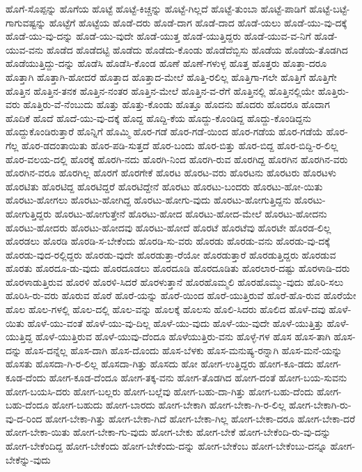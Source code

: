 {ಹೊಗೆ-ಸೊಪ್ಪನ್ನು
ಹೊಗೆಯ
ಹೊಟ್ಟೆ
ಹೊಟ್ಟೆ-ಕಿಚ್ಚನ್ನು
ಹೊಟ್ಟೆ-ಗಿಲ್ಲದೆ
ಹೊಟ್ಟೆ-ತುಂಬಾ
ಹೊಟ್ಟೆ-ಪಾಡಿಗೆ
ಹೊಟ್ಟೆ-ಬಟ್ಟೆ-ಗಾಗುವಷ್ಟನ್ನು
ಹೊಟ್ಟೆಗೆ
ಹೊಟ್ಟೆಯ
ಹೊಡೆ-ದರು
ಹೊಡೆ-ದಾಗ
ಹೊಡೆ-ದಾದ
ಹೊಡೆ-ಯಲು
ಹೊಡೆ-ಯು-ವು-ದಕ್ಕೆ
ಹೊಡೆ-ಯು-ವು-ದನ್ನು
ಹೊಡೆ-ಯು-ವುದೇ
ಹೊಡೆ-ಯುತ್ತ
ಹೊಡೆ-ಯುತ್ತಿದ್ದರು
ಹೊಡೆ-ಯುವ-ವ-ನಿಗೆ
ಹೊಡೆ-ಯುವ-ವನು
ಹೊಡೆದ
ಹೊಡೆದಟ್ಟಿ
ಹೊಡೆದು
ಹೊಡೆದು-ಕೊಂಡು
ಹೊಡೆದೆಬ್ಬಿಸು
ಹೊಡೆಯ
ಹೊಡೆಯ-ತೊಡಗಿದ
ಹೊಡೆಯುತ್ತಿದ್ದು-ದನ್ನು
ಹೊಡೆಸಿ
ಹೊಡೆಸಿ-ಕೊಂಡ
ಹೊಣೆ
ಹೊಣೆ-ಗಳುಳ್ಳ
ಹೊತ್ತ
ಹೊತ್ತರು
ಹೊತ್ತಾ-ದರೂ
ಹೊತ್ತಾಗಿ
ಹೊತ್ತಾಗಿ-ಹೋದರೆ
ಹೊತ್ತಾದ
ಹೊತ್ತಾದ-ಮೇಲೆ
ಹೊತ್ತಿ-ರಲಿಲ್ಲ
ಹೊತ್ತಿಗಾ-ಗಲೇ
ಹೊತ್ತಿಗೆ
ಹೊತ್ತಿಗೇ
ಹೊತ್ತಿನ
ಹೊತ್ತಿನ-ತನಕ
ಹೊತ್ತಿನ-ನಂತರ
ಹೊತ್ತಿನ-ಮೇಲೆ
ಹೊತ್ತಿನ-ವ-ರೆಗೆ
ಹೊತ್ತಿನಲ್ಲಿ
ಹೊತ್ತಿನಲ್ಲಿಯೇ
ಹೊತ್ತಿರು-ವರು
ಹೊತ್ತಿರು-ವೆ-ನೆಂಬುದು
ಹೊತ್ತು
ಹೊತ್ತು-ಕೊಂಡು
ಹೊತ್ತೂ
ಹೊದನು
ಹೊದರು
ಹೊದರೂ
ಹೊದಾಗ
ಹೊದಿಕೆ
ಹೊದೆ
ಹೊದೆ-ಯು-ವು-ದಕ್ಕೆ
ಹೊದ್ದ
ಹೊದ್ದಿ-ಕೆಯ
ಹೊದ್ದು-ಕೊಂಡಿದ್ದ
ಹೊದ್ದು-ಕೊಂಡಿದ್ದನು
ಹೊದ್ದುಕೊಂಡಿರುತ್ತಾರೆ
ಹೊನ್ನಿಗೆ
ಹೊಮ್ಮಿ
ಹೊರ-ಗಡೆ
ಹೊರ-ಗಡೆ-ಯಿಂದ
ಹೊರ-ಗಡೆಯ
ಹೊರ-ಗಡೆಯೆ
ಹೊರ-ಗೆಲ್ಲ
ಹೊರ-ಡದಂತಾಯಿತು
ಹೊರ-ಪಡಿ-ಸುತ್ತದೆ
ಹೊರ-ಬಂದು
ಹೊರ-ಬಿತ್ತು
ಹೊರ-ಬಿದ್ದ
ಹೊರ-ಬಿದ್ದಿ-ರ-ಲಿಲ್ಲ
ಹೊರ-ವಲಯ-ದಲ್ಲಿ
ಹೊರಕ್ಕೆ
ಹೊರಗಿ-ನದು
ಹೊರಗಿ-ನಿಂದ
ಹೊರಗಿ-ರುವ
ಹೊರಗಿದ್ದ
ಹೊರಗಿನ
ಹೊರಗಿನ-ವರು
ಹೊರಗಿನ-ವರೂ
ಹೊರಗಿಲ್ಲ
ಹೊರಗೆ
ಹೊರಗೇಕೆ
ಹೊರಟ
ಹೊರಟ-ವರು
ಹೊರಟನು
ಹೊರಟರು
ಹೊರಟಳು
ಹೊರಟಿತು
ಹೊರಟಿದ್ದ
ಹೊರಟಿದ್ದರೆ
ಹೊರಟಿದ್ದೇನೆ
ಹೊರಟು
ಹೊರಟು-ಬಂದರು
ಹೊರಟು-ಹೋ-ಯಿತು
ಹೊರಟು-ಹೋಗಲು
ಹೊರಟು-ಹೋಗಿದ್ದ
ಹೊರಟು-ಹೋಗು-ವುದು
ಹೊರಟು-ಹೋಗುತ್ತಿದ್ದನು
ಹೊರಟು-ಹೋಗುತ್ತಿದ್ದರು
ಹೊರಟು-ಹೋಗುತ್ತೇನೆ
ಹೊರಟು-ಹೋದ
ಹೊರಟು-ಹೋದ-ಮೇಲೆ
ಹೊರಟು-ಹೋದನು
ಹೊರಟು-ಹೋದರು
ಹೊರಟು-ಹೋದವು
ಹೊರಟು-ಹೋದೆ
ಹೊರಟೆ
ಹೊರಟೆವು
ಹೊರಟೇ
ಹೊರಡ-ಲಿಲ್ಲ
ಹೊರಡಲು
ಹೊರಡಿ
ಹೊರಡಿ-ಸ-ಬೇಕೆಂದು
ಹೊರಡಿ-ಸು-ವರು
ಹೊರಡು
ಹೊರಡು-ವನು
ಹೊರಡು-ವು-ದಕ್ಕೆ
ಹೊರಡು-ವುದ-ರಲ್ಲಿದ್ದರು
ಹೊರಡು-ವುದೇ
ಹೊರಡುತ್ತಾ-ರೆಯೋ
ಹೊರಡುತ್ತಾರೆ
ಹೊರಡುತ್ತಿದ್ದರು
ಹೊರಡುವ
ಹೊರತು
ಹೊರದೂ-ಡು-ವುದು
ಹೊರದೂಡಲು
ಹೊರದೂಡಿ
ಹೊರದೂಡಿತು
ಹೊರಲಾರ-ದಷ್ಟು
ಹೊರಳಾಡಿ-ದರು
ಹೊರಳಾಡುತ್ತಿರುವ
ಹೊರಳಿ
ಹೊರಳಿ-ಸಿದರೆ
ಹೊರಳುತ್ತಾನೆ
ಹೊರಹೊಮ್ಮಲಿ
ಹೊರಹೊಮ್ಮು-ವುದು
ಹೊರಿ-ಸಲು
ಹೊರಿಸಿ-ರು-ವರು
ಹೊರುವ
ಹೊರೆ
ಹೊರೆ-ಯನ್ನು
ಹೊರೆ-ಯಿಂದ
ಹೊರೆ-ಯುತ್ತಿರುವೆ
ಹೊರೆ-ಹೊ-ರುವ
ಹೊರೆಯೇ
ಹೊಲ
ಹೊಲ-ಗಳಲ್ಲಿ
ಹೊಲ-ದಲ್ಲಿ
ಹೊಲ-ವನ್ನು
ಹೊಲಕ್ಕೆ
ಹೊಲಸು
ಹೊಲಿ-ಸಿದರು
ಹೊಲಿದ
ಹೊಳೆ-ದವು
ಹೊಳೆ-ಯಿತು
ಹೊಳೆ-ಯು-ವಂತೆ
ಹೊಳೆ-ಯು-ವು-ದಿಲ್ಲ
ಹೊಳೆ-ಯು-ವುದು
ಹೊಳೆ-ಯು-ವುದೇ
ಹೊಳೆ-ಯುತ್ತಿತ್ತು
ಹೊಳೆ-ಯುತ್ತಿದ್ದ
ಹೊಳೆ-ಯುತ್ತಿರುವ
ಹೊಳೆ-ಯುವು-ದೆಂದೂ
ಹೊಳೆಯುತ್ತಿರು-ವನು
ಹೊಳ್ಳೆ-ಗಳ
ಹೊಸ
ಹೊಸ-ತಾಗಿ
ಹೊಸ-ದನ್ನು
ಹೊಸ-ದನ್ನೆಲ್ಲ
ಹೊಸ-ದಾಗಿ
ಹೊಸ-ದೊಂದು
ಹೊಸ-ಬೆಳಕು
ಹೊಸ-ಮನುಷ್ಯ-ರನ್ನಾಗಿ
ಹೊಸ-ಮನೆ-ಯನ್ನು
ಹೊಸತು
ಹೊಸದಾ-ಗಿ-ರ-ಲಿಲ್ಲ
ಹೊಸದಾ-ಗಿತ್ತು
ಹೊಸದು
ಹೋ
ಹೋಗ-ಉತ್ತಿದ್ದರು
ಹೋಗ-ಕೂ-ಡದು
ಹೋಗ-ಕೂಡ-ದೆಂದು
ಹೋಗ-ಕೂಡ-ದೆಂದೂ
ಹೋಗ-ತಕ್ಕ-ವನು
ಹೋಗ-ತೊಡಗಿದ
ಹೋಗ-ದಂತೆ
ಹೋಗ-ಬಯ-ಸುವನು
ಹೋಗ-ಬಯಸಿ-ದರು
ಹೋಗ-ಬಲ್ಲರು
ಹೋಗ-ಬಲ್ಲೆವು
ಹೋಗ-ಬಹು-ದಾ-ಗಿತ್ತು
ಹೋಗ-ಬಹು-ದೆಂದು
ಹೋಗ-ಬಹು-ದೆಂದೂ
ಹೋಗ-ಬಹುದು
ಹೋಗ-ಬಾರದು
ಹೋಗ-ಬೇಕಾಗಿ
ಹೋಗ-ಬೇಕಾ-ಗಿ-ರ-ಲಿಲ್ಲ
ಹೋಗ-ಬೇಕಾಗಿ-ರು-ವು-ದ-ರಿಂದ
ಹೋಗ-ಬೇಕಾ-ಗಿತ್ತು
ಹೋಗ-ಬೇಕಾ-ಗಿದೆ
ಹೋಗ-ಬೇಕಾ-ಗಿಲ್ಲ
ಹೋಗ-ಬೇಕಾ-ದರೂ
ಹೋಗ-ಬೇಕಾ-ದರೆ
ಹೋಗ-ಬೇಕಾ-ಯಿತು
ಹೋಗ-ಬೇಕಾ-ಗು-ವುದು
ಹೋಗ-ಬೇಕು
ಹೋಗ-ಬೇಕೆ
ಹೋಗ-ಬೇಕೆಂದಿ-ರು-ವು-ದನ್ನು
ಹೋಗ-ಬೇಕೆಂದಿದ್ದ
ಹೋಗ-ಬೇಕೆಂದು
ಹೋಗ-ಬೇಕೆಂದು-ದನ್ನು
ಹೋಗ-ಬೇಕೆಂಬ
ಹೋಗ-ಬೇಕೆಂಬು-ದನ್ನೂ
ಹೋಗ-ಬೇಕೆನ್ನು-ವುದು
}
